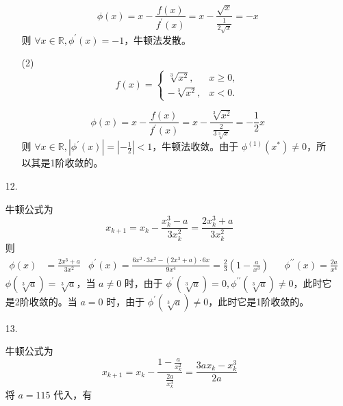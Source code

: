 \documentclass{sjtuarticle}
\begin{document}
\begin{itemize}
\begin{solution}
\begin{itemize}
            \begin{equation*}
                \phi(x)=x-\frac{f(x)}{f^\prime(x)}=x-\frac{\sqrt{x}}{\frac{1}{2\sqrt{x}}}=-x
            \end{equation*}    
            则 $\forall x\in \mathbb{R}, \phi^\prime(x)=-1$，牛顿法发散。
            \item[(2)] \begin{equation*}
                f(x)=\begin{cases}
                    \sqrt[3]{x^2},&x\geq 0,\\
                    -\sqrt[3]{x^2},&x<0.
                \end{cases}
            \end{equation*}

            \begin{equation*}
                \phi(x)=x-\frac{f(x)}{f^\prime(x)}=x-\frac{\sqrt[3]{x^2}}{\frac{2}{3\sqrt[3]{x}}}=-\frac{1}{2}x
            \end{equation*}
            则 $\forall x\in \mathbb{R}, |\phi^\prime(x)|=|-\frac{1}{2}|<1$，牛顿法收敛。由于 $\phi^{(1)}(x^*)\neq 0$，所以其是1阶收敛的。
        \end{itemize}
    \end{solution}
    \item[12.] \begin{solution}
        牛顿公式为
        \begin{equation*}
            x_{k+1}=x_k-\frac{x_k^3-a}{3x_k^2}=\frac{2x_k^3+a}{3x_k^2}
        \end{equation*}
        则
        \begin{align*}
            \phi(x)&=\frac{2x^3+a}{3x^2}& \phi^\prime(x)=\frac{6x^2\cdot 3x^2-(2x^3+a)\cdot 6x}{9x^4}=\frac{2}{3}\left(1-\frac{a}{x^3}\right) & & \phi^{\prime\prime}(x)=\frac{2a}{x^4}
        \end{align*}
        $\phi(\sqrt[3]{a})=\sqrt[3]{a}$，当 $a\neq 0$ 时，由于 $\phi^\prime(\sqrt[3]{a})=0,\phi^{\prime\prime}(\sqrt[3]{a})\neq 0$，此时它是2阶收敛的。当 $a=0$ 时，由于 $\phi^\prime(\sqrt[3]{a})\neq 0$，此时它是1阶收敛的。
    \end{solution}
    \item[13.] \begin{solution} 牛顿公式为
        \begin{equation*}
            x_{k+1}=x_k-\frac{1-\frac{a}{x_k^2}}{\frac{2a}{x_k^3}}=\frac{3ax_k-x_k^3}{2a}
        \end{equation*}
        将 $a=115$ 代入，有

\end{solution}
\end{itemize}
\end{document}
